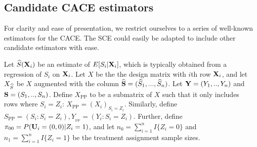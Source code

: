 \documentclass{article}
\def\spp{_{\text{PP}}}
\def\xpp{X\spp}
\newtheorem{assumption}{Assumption}
\begin{document}






\subsection{Candidate CACE estimators}
For clarity and ease of presentation, we restrict ourselves to a series of well-known estimators for the CACE. The SCE could easily be adapted to include other candidate estimators with ease. 

Let ${\widehat S}({\bf X}_i)$ be an estimate of $E[S_i | {\bf X}_i]$, which is typically obtained from a regression of $S_i$ on ${\bf X}_i$. Let $X$ be the the design matrix with $i$th row ${\bf X}_i$, and let $X_{\widehat S}$ be $X$ augmented with the column ${\widehat {{\bf S}}} = ({\widehat S}_1, ..., {\widehat S}_n)$. Let ${\bf Y} = (Y_1, .., Y_n)$ and ${\bf S} = (S_1, .., S_n)$. Define $\xpp$ to be a submatrix of $X$ such that it only includes rows where $S_i = Z_i$: $\xpp = (X_i)_{S_i = Z_i}$. Similarly, define $S\spp = (S_i : S_i = Z_i), Y_\spp = (Y_i : S_i = Z_i)$. Further, define $\pi_{00} = P({\bf U}_i = (0,0) | Z_i = 1)$, and let $n_0 = \sum_{i=1}^n I\{Z_i = 0\}$ and $n_1 = \sum_{i=1}^n I\{Z_i = 1\}$ be the treatment assignment sample sizes.
\end{document}
